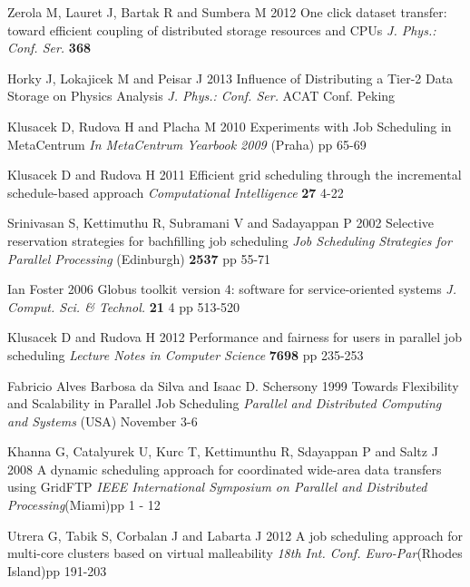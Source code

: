 \documentclass[a4paper,10pt]{article}
\begin{document}
\begin{thebibliography}{9}

 Zerola M, Lauret J, Bartak R and Sumbera M 2012
 One click dataset transfer: toward efficient coupling of distributed storage resources and CPUs  \textit{J. Phys.: Conf. Ser.} \textbf{368} 

Horky J, Lokajicek M and Peisar J 2013
Influence of Distributing a Tier-2 Data Storage on Physics Analysis
\textit{J. Phys.: Conf. Ser.} ACAT Conf. Peking

Klusacek D, Rudova H and Placha M 2010
Experiments with Job Scheduling in MetaCentrum
\textit{In MetaCentrum Yearbook 2009} (Praha) pp 65-69 

Klusacek D and Rudova H 2011
Efficient grid scheduling through the incremental schedule-based approach
\textit{Computational Intelligence} \textbf{27} 4-22

Srinivasan S, Kettimuthu R, Subramani V and Sadayappan P 2002
Selective reservation strategies for bachfilling job scheduling
\textit{Job Scheduling Strategies for Parallel Processing} (Edinburgh) \textbf{2537} pp 55-71

Ian Foster 2006
Globus toolkit version 4: software for service-oriented systems
\textit{J. Comput. Sci. \& Technol.} 
\textbf{21} 4 pp 513-520

Klusacek D and Rudova H 2012
Performance and fairness for users in parallel job scheduling
\textit{Lecture Notes in Computer Science} \textbf{7698} pp 235-253

Fabricio Alves Barbosa da Silva and Isaac D. Schersony 1999
Towards Flexibility and Scalability in Parallel Job Scheduling
\textit{Parallel and Distributed Computing and Systems} (USA) November 3-6 

Khanna G, Catalyurek U, Kurc T, Kettimunthu R, Sdayappan P and Saltz J 2008
A dynamic scheduling approach for coordinated wide-area data transfers using GridFTP
\textit{IEEE International Symposium on Parallel and Distributed Processing}(Miami)pp 1 - 12

Utrera G, Tabik S, Corbalan J and Labarta J 2012
A job scheduling approach for multi-core clusters based on virtual malleability
\textit{18th Int. Conf. Euro-Par}(Rhodes Island)pp 191-203


\end{thebibliography}
\end{document}
